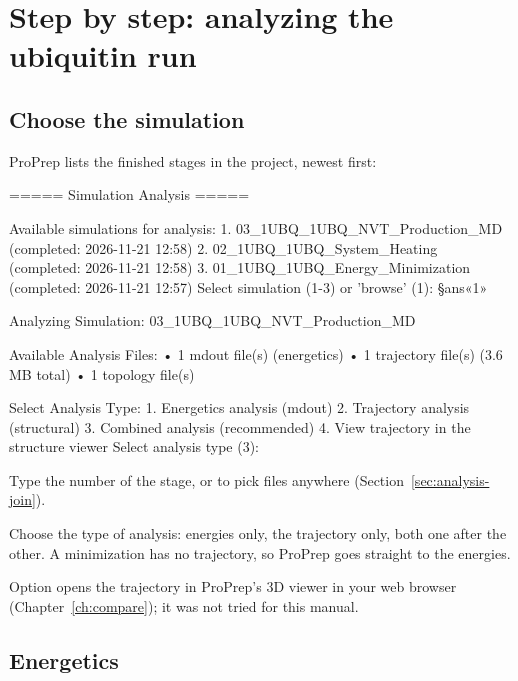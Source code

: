 \section{Step by step: analyzing the ubiquitin run}\label{sec:analysis-steps}

\subsection{Choose the simulation}

ProPrep lists the finished stages in the project, newest first:

\begin{screen}
===== Simulation Analysis =====

Available simulations for analysis:
  1. 03_1UBQ_1UBQ_NVT_Production_MD (completed: 2026-11-21 12:58)
  2. 02_1UBQ_1UBQ_System_Heating (completed: 2026-11-21 12:58)
  3. 01_1UBQ_1UBQ_Energy_Minimization (completed: 2026-11-21 12:57)
Select simulation (1-3) or 'browse' (1): §ans«1»

Analyzing Simulation: 03_1UBQ_1UBQ_NVT_Production_MD

Available Analysis Files:
  • 1 mdout file(s) (energetics)
  • 1 trajectory file(s) (3.6 MB total)
  • 1 topology file(s)

Select Analysis Type:
  1. Energetics analysis (mdout)
  2. Trajectory analysis (structural)
  3. Combined analysis (recommended)
  4. View trajectory in the structure viewer
Select analysis type (3):
\end{screen}

\begin{steps}
  \item Type the number of the stage, or  to pick files
        anywhere (Section~\ref{sec:analysis-join}).
  \item Choose the type of analysis:  energies only,  the
        trajectory only,  both one after the other. A minimization has
        no trajectory, so ProPrep goes straight to the energies.
\end{steps}

Option  opens the trajectory in ProPrep's 3D viewer in your web browser
(Chapter~\ref{ch:compare}); it was not tried for this manual.

\subsection{Energetics}\label{sec:analysis-energy}

